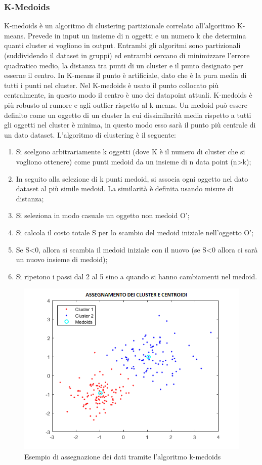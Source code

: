 \subsubsection{K-Medoids}
K-medoids è un algoritmo di clustering partizionale correlato all'algoritmo K-means. Prevede in input un insieme di n oggetti e un numero k che determina quanti cluster si vogliono in output. Entrambi gli algoritmi sono partizionali (suddividendo il dataset in gruppi) ed entrambi cercano di minimizzare l'errore quadratico medio, la distanza tra punti di un cluster e il punto designato per esserne il centro. In K-means il punto è artificiale, dato che è la pura media di tutti i punti nel cluster. Nel K-medoids è usato il punto collocato più centralmente, in questo modo il centro è uno dei datapoint attuali. K-medoids è più robusto al rumore e agli outlier rispetto al k-means. Un medoid può essere definito come un oggetto di un cluster la cui dissimilarità media rispetto a tutti gli oggetti nel cluster è minima, in questo modo esso sarà il punto più centrale di un dato dataset.
L'algoritmo di clustering è il seguente:
\begin{enumerate}
	\item Si scelgono arbitrariamente k oggetti (dove K è il numero di cluster che si vogliono ottenere) come punti medoid da un insieme di n data point (n>k);
	\item In seguito alla selezione di k punti medoid, si associa ogni oggetto nel dato dataset al più simile medoid. La similarità è definita usando misure di distanza;
	\item Si seleziona in modo casuale un oggetto non medoid O';
	\item Si calcola il costo totale S per lo scambio del medoid iniziale nell'oggetto O';
	\item Se S<0, allora si scambia il medoid iniziale con il nuovo (se S<0 allora ci sarà un nuovo insieme di medoid);
	\item Si ripetono i passi dal 2 al 5 sino a quando si hanno cambiamenti nel medoid.
\end{enumerate}
\begin{figure}[h!]
	\centering
	\includegraphics[scale=0.50]{images/example_kmedoids.png}
	\caption{Esempio di assegnazione dei dati tramite l'algoritmo k-medoids}
\end{figure}
